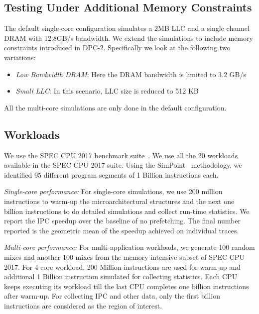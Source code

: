 \subsection{Testing Under Additional Memory Constraints}
\label{Method-AdditionalMem}
The default single-core configuration simulates a 2MB LLC and a single
channel DRAM with 12.8GB/s bandwidth.  We extend the simulations to
include memory constraints introduced in DPC-2.  Specifically we look
at the following two variations:
\begin{itemize}
\item \textit{Low Bandwidth DRAM}: Here the DRAM bandwidth is limited
  to 3.2 GB/s
\item \textit{Small LLC}: In this scenario, LLC size is reduced to 512
  KB
\end{itemize}
All the multi-core simulations are only done in the default
configuration.

\subsection{Workloads}
\label{Method-Workloads}

We use the SPEC CPU 2017 benchmark suite~\cite{SPEC2017}.  We use all the 20
workloads available in the SPEC CPU 2017 suite.  Using the SimPoint~\cite{SimPoint}
methodology, we identified 95 different program segments of 1 Billion
instructions each.

\textit{Single-core performance:} For single-core simulations, we use 200
million instructions to warm-up the microarchitectural structures and the next
one billion instructions to do detailed simulations and collect run-time
statistics. We report the IPC speedup over the baseline of no prefetching.
The final number reported is the geometric mean of the speedup achieved on
individual traces.

\textit{Multi-core performance:} For multi-application workloads, we generate
100 random mixes and another 100 mixes from the memory intensive subset of
SPEC CPU 2017.  For 4-core workload, 200 Million instructions are used for warm-up
and additional 1 Billion instruction simulated for collecting statistics.
Each CPU keeps executing its workload till the last CPU completes one billion
instructions after warm-up.  For collecting IPC and other data, only the first
billion instructions are considered as the region of interest.

